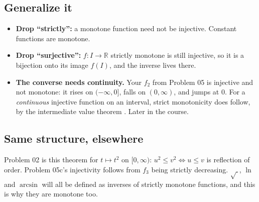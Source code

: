 \documentclass{kaelearn}
\begin{document}
\begin{center}
\end{center}

\subsection{Generalize it}
\begin{itemize}
  \item \textbf{Drop ``strictly'':} a monotone function need not be injective. Constant functions are monotone.
  \item \textbf{Drop ``surjective'':} $f:I\to\mathbb{R}$ strictly monotone is still injective, so it is a bijection
        onto its image $f(I)$, and the inverse lives there.
  \item \textbf{The converse needs continuity.} Your $f_2$ from Problem 05 is injective and not monotone: it rises on
        $(-\infty,0]$, falls on $(0,\infty)$, and jumps at $0$. For a \emph{continuous} injective function on an
        interval, strict monotonicity does follow, by the intermediate value theorem
        . Later in the course.
\end{itemize}

\subsection{Same structure, elsewhere}
Problem 02 is this theorem for $t\mapsto t^2$ on $[0,\infty)$: $u^2\le v^2\Leftrightarrow u\le v$ is reflection of
order. Problem 05c's injectivity follows from $f_3$ being strictly decreasing. $\sqrt{\ }$, $\ln$ and $\arcsin$ will
all be defined as inverses of strictly monotone functions, and this is why they are monotone too.
\end{document}
